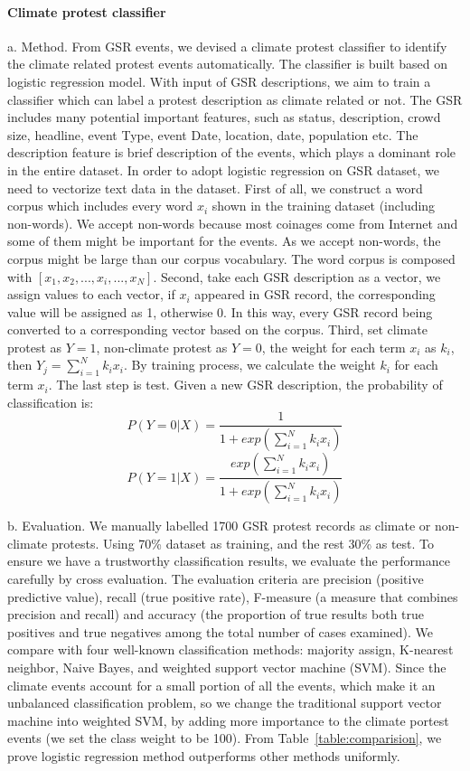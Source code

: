 \documentclass[9pt,twocolumn,twoside]{pnas-new}
\begin{document}
{\paragraph{Climate protest classifier}
a. Method. From GSR events, we devised a climate protest classifier to identify the climate related protest events automatically. The classifier is built based on logistic regression model. With input of GSR descriptions, we aim to train a classifier which can label a protest description as climate related or not. The GSR includes many potential important features, such as status, description, crowd size, headline, event Type, event Date, location, date, population etc. The description feature is brief description of the events, which plays a dominant role in the entire dataset. In order to adopt logistic regression on GSR dataset, we need to vectorize text data in the dataset. First of all, we construct a word corpus which includes every word $x_i$ shown in the training dataset (including non-words). We accept non-words because most coinages come from Internet and some of them might be important for the events. As we accept non-words, the corpus might be large than our corpus vocabulary. The word corpus is composed with $[x_1, x_2, ..., x_i, ..., x_N]$.
Second, take each GSR description as a vector, we assign values to each vector, if $x_i$ appeared in GSR record, the corresponding value will be assigned as 1, otherwise 0. In this way, every GSR record being converted to a corresponding vector based on the corpus. Third, set climate protest as $Y=1$, non-climate protest as $Y=0$, the weight for each term $x_i$ as $k_i$, then $Y_j = \sum_{i=1}^{N} k_i x_i $. By training process, we calculate the weight $k_i$ for each term $x_i$. The last step is test. Given a new GSR description, the probability of classification is:
$$P(Y = 0| X)= \frac{1}{1+exp( {\sum_{i=1}^{N} k_ix_i})}$$
$$P(Y = 1| X)= \frac{exp( {\sum_{i=1}^{N} k_ix_i})}{1+exp( {\sum_{i=1}^{N} k_ix_i})}$$


b. Evaluation. We manually labelled 1700 GSR protest records as climate or non-climate protests. Using 70\% dataset as training, and the rest 30\% as test. To ensure we have a trustworthy classification results, we evaluate the performance carefully by cross evaluation. The evaluation criteria are precision (positive predictive value), recall (true positive rate), F-measure (a measure that combines precision and recall) and accuracy (the proportion of true results both true positives and true negatives among the total number of cases examined). We compare with four well-known classification methods: majority assign, K-nearest neighbor, Naive Bayes, and weighted support vector machine (SVM). Since the climate events account for a small portion of all the events, which make it an unbalanced classification problem, so we change the traditional support vector machine into weighted SVM, by adding more importance to the climate portest events (we set the class weight to be 100). From Table~\ref{table:comparision}, we prove logistic regression method outperforms other methods uniformly.

}
\end{document}
